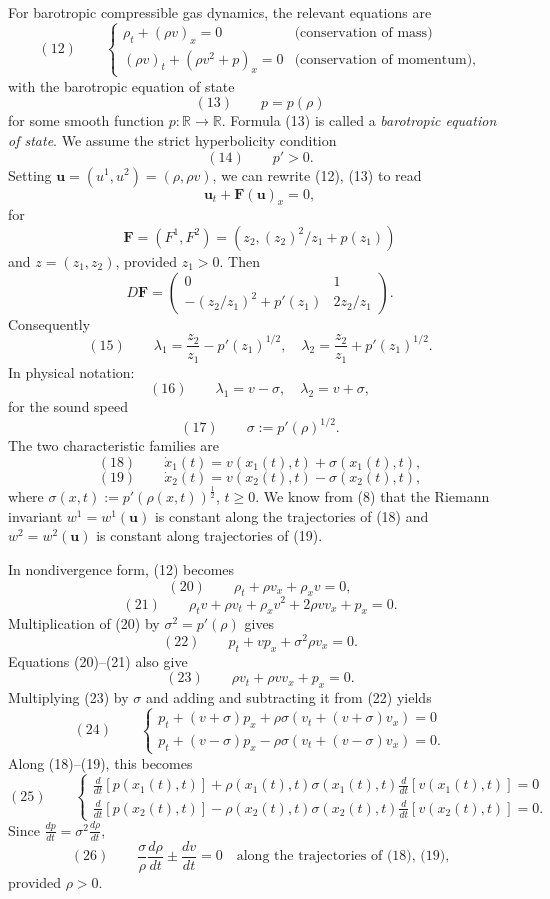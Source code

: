 \begin{example}
\label{ex:barotropic-gas-dynamics-riemann-invariants}
For barotropic compressible gas dynamics, the relevant equations are
$$(12) \qquad \begin{cases} \rho_t + (\rho v)_x = 0 & \text{(conservation of mass)} \\ (\rho v)_t + (\rho v^2+p)_x = 0 & \text{(conservation of momentum)}, \end{cases}$$
with the barotropic equation of state
$$(13) \qquad p = p(\rho)$$
for some smooth function $p:\mathbb{R}\to\mathbb{R}$. Formula (13) is called a \textit{barotropic equation of state}. We assume the strict hyperbolicity condition
$$(14) \qquad p' > 0.$$
Setting $\mathbf{u}=(u^1,u^2)=(\rho,\rho v)$, we can rewrite (12), (13) to read
$$\mathbf{u}_t + \mathbf{F}(\mathbf{u})_x = 0,$$
for
$$\mathbf{F} = (F^1,F^2) = (z_2, (z_2)^2/z_1 + p(z_1))$$
and $z=(z_1,z_2)$, provided $z_1>0$. Then
$$D\mathbf{F} = \begin{pmatrix} 0 & 1 \\ -(z_2/z_1)^2 + p'(z_1) & 2z_2/z_1 \end{pmatrix}.$$
Consequently
$$(15) \qquad \lambda_1 = \frac{z_2}{z_1} - p'(z_1)^{1/2}, \quad \lambda_2 = \frac{z_2}{z_1} + p'(z_1)^{1/2}.$$
In physical notation:
$$(16) \qquad \lambda_1 = v-\sigma, \quad \lambda_2 = v+\sigma,$$
for the sound speed
$$(17) \qquad \sigma := p'(\rho)^{1/2}.$$
The two characteristic families are
$$(18) \qquad \dot x_1(t) = v(x_1(t),t) + \sigma(x_1(t),t),$$
$$(19) \qquad \dot x_2(t) = v(x_2(t),t) - \sigma(x_2(t),t),$$
where $\sigma(x,t) := p'(\rho(x,t))^{\frac12}$, $t\geq 0$. We know from (8) that the Riemann invariant $w^1=w^1(\mathbf{u})$ is constant along the trajectories of (18) and $w^2=w^2(\mathbf{u})$ is constant along trajectories of (19).

In nondivergence form, (12) becomes
$$(20) \qquad \rho_t + \rho v_x + \rho_x v = 0,$$
$$(21) \qquad \rho_t v + \rho v_t + \rho_x v^2 + 2\rho v v_x + p_x = 0.$$
Multiplication of (20) by $\sigma^2=p'(\rho)$ gives
$$(22) \qquad p_t + vp_x + \sigma^2\rho v_x = 0.$$
Equations (20)--(21) also give
$$(23) \qquad \rho v_t + \rho v v_x + p_x = 0.$$
Multiplying (23) by $\sigma$ and adding and subtracting it from (22) yields
$$(24) \qquad \begin{cases} p_t + (v+\sigma)p_x + \rho\sigma(v_t+(v+\sigma)v_x) = 0 \\ p_t + (v-\sigma)p_x - \rho\sigma(v_t+(v-\sigma)v_x) = 0. \end{cases}$$
Along (18)--(19), this becomes
$$(25) \qquad \begin{cases} \frac{d}{dt}[p(x_1(t),t)] + \rho(x_1(t),t)\sigma(x_1(t),t)\frac{d}{dt}[v(x_1(t),t)] = 0 \\ \frac{d}{dt}[p(x_2(t),t)] - \rho(x_2(t),t)\sigma(x_2(t),t)\frac{d}{dt}[v(x_2(t),t)] = 0. \end{cases}$$
Since $\frac{dp}{dt}=\sigma^2\frac{d\rho}{dt}$,
$$(26) \qquad \frac{\sigma}{\rho}\frac{d\rho}{dt} \mathbin{\pm} \frac{dv}{dt} = 0 \quad \text{along the trajectories of (18), (19),}$$
provided $\rho>0$.


\end{example}
